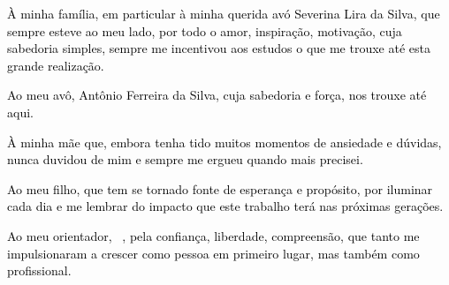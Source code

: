 \documentclass[12pt]{article} %
\begin{document}
    \begin{itathanks}
        \textcolor{black}{À minha família, em particular à minha querida avó Severina Lira da Silva, que sempre esteve ao meu lado, por todo o amor, inspiração, motivação, cuja sabedoria simples, sempre me incentivou aos estudos o que me trouxe até esta grande realização.}

        \textcolor{black}{Ao meu avô, Antônio Ferreira da Silva, cuja sabedoria e força, nos trouxe até aqui.}
        
        \textcolor{black}{À minha mãe que, embora tenha tido muitos momentos de ansiedade e dúvidas, nunca duvidou de mim e sempre me ergueu quando mais precisei.}

        \textcolor{black}{Ao meu filho, que tem se tornado fonte de esperança e propósito, por iluminar cada dia e me lembrar do impacto que este trabalho terá nas próximas gerações.}

        \textcolor{black}{Ao meu orientador, \itaadvisortitle~\itaadvisorname, pela confiança, liberdade, compreensão, que tanto me impulsionaram a crescer como pessoa em primeiro lugar, mas também como profissional.}
    \end{itathanks}
\end{document}
